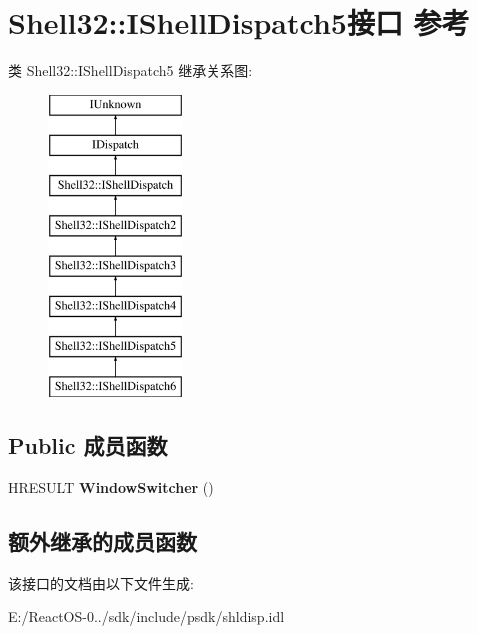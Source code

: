\hypertarget{interface_shell32_1_1_i_shell_dispatch5}{}\section{Shell32\+:\+:I\+Shell\+Dispatch5接口 参考}
\label{interface_shell32_1_1_i_shell_dispatch5}
类 Shell32\+:\+:I\+Shell\+Dispatch5 继承关系图\+:\begin{figure}[H]
\begin{center}
\leavevmode
\includegraphics[height=8.000000cm]{interface_shell32_1_1_i_shell_dispatch5}
\end{center}
\end{figure}
\subsection*{Public 成员函数}
\begin{DoxyCompactItemize}
\item 
\mbox{\label{interface_shell32_1_1_i_shell_dispatch5_a01482ed587c0faf89c45aa2d72cfd9f4}} 
H\+R\+E\+S\+U\+LT {\bfseries Window\+Switcher} ()
\end{DoxyCompactItemize}
\subsection*{额外继承的成员函数}


该接口的文档由以下文件生成\+:\begin{DoxyCompactItemize}
\item 
E\+:/\+React\+O\+S-\/0../sdk/include/psdk/shldisp.\+idl\end{DoxyCompactItemize}
